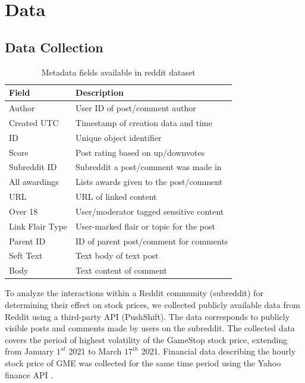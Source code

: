 \documentclass[noacm,sigconf,authorversion]{acmart}
\begin{document}
\section{Data}

\subsection{Data Collection}

\begin{table}
    \centering
\begin{tabularx}{\linewidth}{l | l }
    \hline
    Field            & Description \\ \hline \hline 
    Author           & User ID of post/comment author \\ \hline
    Created UTC      & Timestamp of creation data and time \\ \hline
    ID               & Unique object identifier \\ \hline
    Score            & Post rating based on up/downvotes \\ \hline
    Subreddit ID     & Subreddit a post/comment was made in \\ \hline
    All awardings    & Lists awards given to the post/comment \\ \hline
    URL              & URL of linked content \\ \hline
    Over 18          & User/moderator tagged sensitive content \\ \hline
    Link Flair Type  & User-marked flair or topic for the post \\ \hline
    Parent ID        & ID of parent post/comment for comments \\ \hline
    Seft Text        & Text body of text post \\  \hline
    Body             & Text content of comment \\ \hline
\end{tabularx}
    \caption{Metadata fields available in reddit dataset}
    \label{tab:reddit_meta}
\end{table}

To analyze the interactions within a Reddit community (subreddit) for determining their effect on stock prices, we collected publicly available data from Reddit using a third-party API (PushShift). 
The data corresponds to publicly visible posts and comments made by users on the subreddit.
The collected data covers the period of highest volatility of the GameStop stock price, extending from January $1^{st}$ 2021 to March $17^{th}$ 2021. Financial data describing the hourly stock price of GME was collected for the same time period using the Yahoo finance API \cite{berube2007retrieving}.
\end{document}
